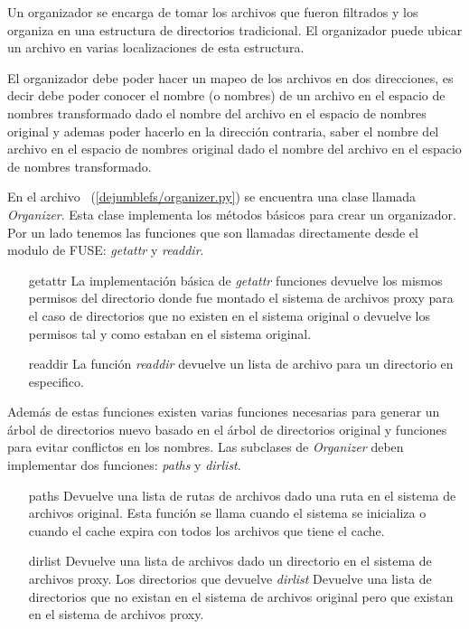 Un organizador se encarga de tomar los archivos que fueron filtrados y los organiza en una estructura de directorios tradicional. El organizador puede ubicar un archivo en varias localizaciones de esta estructura.

El organizador debe poder hacer un mapeo de los archivos en dos direcciones, es decir debe poder conocer el nombre (o nombres) de un archivo en el espacio de nombres transformado dado el nombre del archivo en el espacio de nombres original y ademas poder hacerlo en la dirección contraria, saber el nombre del archivo en el espacio de nombres original dado el nombre del archivo en el espacio de nombres transformado.


En el archivo ~(\ref{dejumblefs/organizer.py}) se encuentra una clase llamada \textit{Organizer}. Esta clase implementa los métodos básicos para crear un organizador. Por un lado tenemos las funciones que son llamadas directamente desde el modulo de FUSE: \textit{getattr} y \textit{readdir}.

\begin{itemize}
\item[getattr] La implementación básica de \textit{getattr} funciones devuelve los mismos permisos del directorio donde fue montado el sistema de archivos proxy para el caso de directorios que no existen en el sistema original o devuelve los permisos tal y como estaban en el sistema original.
\item[readdir] La función \textit{readdir} devuelve un lista de archivo para un directorio en especifico.
\end{itemize}

Además de estas funciones existen varias funciones necesarias para generar un árbol de directorios nuevo basado en el árbol de directorios original y funciones para evitar conflictos en los nombres. Las subclases de \textit{Organizer} deben implementar dos funciones: \textit{paths} y \textit{dirlist}.

\begin{itemize}
\item[paths] Devuelve una lista de rutas de archivos dado una ruta en el sistema de archivos original. Esta función se llama cuando el sistema se inicializa o cuando el cache expira con todos los archivos que tiene el cache.
\item[dirlist] Devuelve una lista de archivos dado un directorio en el sistema de archivos proxy. Los directorios que devuelve \textit{dirlist} Devuelve una lista de directorios que no existan en el sistema de archivos original pero que existan en el sistema de archivos proxy.
\end{itemize}

